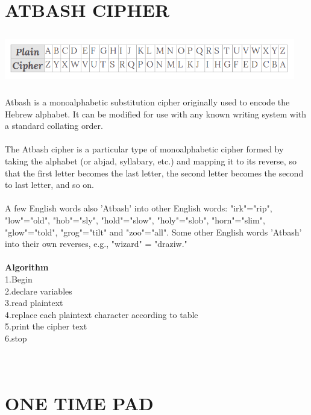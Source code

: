 \documentclass[11pt]{article}
\begin{document}
\section{\textbf{ATBASH CIPHER}}

\includegraphics[width=5in,height=0.9in]{atbash.png}

Atbash is a monoalphabetic substitution cipher originally used to encode the Hebrew alphabet. It can be modified for use with any known writing system with a standard collating order.
\\
\\
The Atbash cipher is a particular type of monoalphabetic cipher formed by taking the alphabet (or abjad, syllabary, etc.) and mapping it to its reverse, so that the first letter becomes the last letter, the second letter becomes the second to last letter, and so on.
\\
\\
A few English words also 'Atbash' into other English words: "irk"="rip", "low"="old", "hob"="sly", "hold"="slow", "holy"="slob", "horn"="slim", "glow"="told", "grog"="tilt" and "zoo"="all". Some other English words 'Atbash' into their own reverses, e.g., "wizard" = "draziw."
\\
\\
\textbf{Algorithm}
\\
1.Begin\\
2.declare variables\\
3.read plaintext\\
4.replace each plaintext character according to table\\
5.print the cipher text\\
6.stop\\
\\
\\


\section{\textbf{ONE TIME PAD}}
\end{document}
